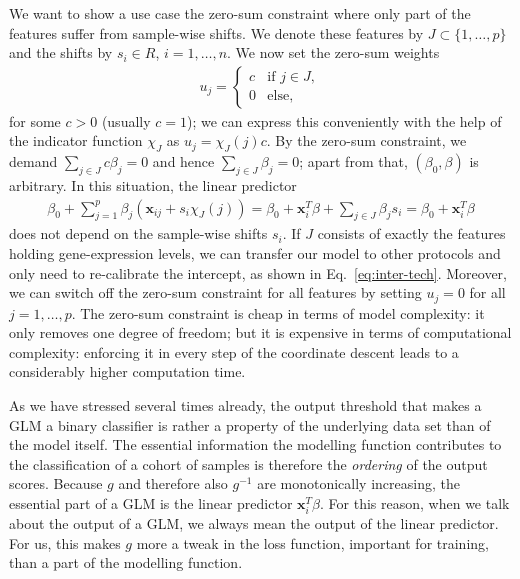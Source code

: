 We want to show a use case the zero-sum constraint where only part of the features suffer from 
sample-wise shifts. We denote these features by $J \subset \{1, \ldots, p\}$ and the shifts by 
$s_i \in R$, $i = 1, \ldots, n$. We now set the zero-sum 
weights  
\begin{align}
    u_j =
    \begin{cases}
        c & \text{if } j \in J, \\
        0 & \text{else},
    \end{cases}
\end{align}
for some $c > 0$ (usually $c = 1$); we can express this conveniently with the help of the indicator 
function $\chi_J$ as $u_j = \chi_J(j) c$. By the zero-sum constraint, we demand 
$\sum_{j \in J} c \beta_j = 0$  
and hence $\sum_{j \in J} \beta_j = 0$; apart from that, $(\beta_0, \beta)$ is arbitrary. 
In this situation, the linear predictor 
\begin{align}\label{eq:zerosum-sample-shifts}
    \beta_0 + \sum_{j=1}^p \beta_j (\mathbf{x}_{ij} + s_i \chi_J(j))
    = \beta_0 + \mathbf{x}_i^T \beta + \sum_{j \in J} \beta_j s_i = \beta_0 + \mathbf{x}_i^T \beta
\end{align}
does not depend on the sample-wise shifts $s_i$. If $J$ consists of 
exactly the features holding gene-expression levels, we can transfer our model to other protocols 
and only need to re-calibrate the intercept, as shown in Eq.\ \eqref{eq:inter-tech}. Moreover, we 
can switch off the zero-sum constraint for all features by setting $u_j = 0$ for all 
$j = 1, \ldots, p$. The zero-sum constraint is cheap in terms of model complexity: it only removes 
one degree of freedom; but it is expensive in terms of computational complexity: enforcing it in
every step of the coordinate descent leads to a considerably higher computation time. 

As we have stressed several times already, the output threshold that makes a GLM a binary classifier 
is rather a property of the underlying data set than of the model itself. The essential information 
the modelling function contributes to the classification of a cohort of samples is therefore the 
\textit{ordering} of the output scores. Because $g$ and therefore also $g^{-1}$ are monotonically increasing, 
the essential part of a GLM is the linear predictor $\mathbf{x}_i^T \beta$. For this reason, when we 
talk about the output of a GLM, we always mean the output of the linear predictor. For us, this 
makes $g$ more a tweak in the loss function, important for training, than a part of the modelling 
function.

